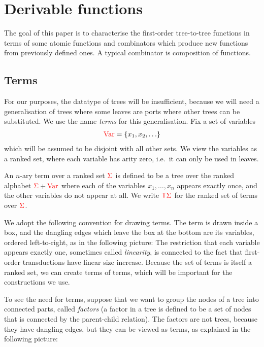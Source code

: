 \section{Derivable functions}
The goal of this paper is to characterise the first-order tree-to-tree functions in terms of some atomic functions and combinators which produce new functions from previously defined ones. A typical combinator is composition of functions.

\subsection{Terms}
For our purposes, the datatype of trees will be insufficient, because  we will need a generalisation of trees where some leaves  are ports   where other trees can be substituted. We use the name \emph{terms} for this generalisation. Fix a set of variables
\begin{align*}
    {{\color{red}{\mathrm{Var}}}} = \{x_1,x_2,\ldots\}
\end{align*}
which will be assumed to be disjoint with all other sets.  We view the variables as a ranked set, where each variable has arity zero, i.e.~it can only be used in leaves. 

\begin{definition}[Terms]\label{def:terms}
    An $n$-ary term over a ranked set ${\color{red}{\Sigma}}$ is defined to be a tree over the ranked alphabet ${\color{red}{\Sigma}} + {{\color{red}{\mathrm{Var}}}}$ where each of the  variables $x_1,\ldots,x_n$ appears exactly once,  and the other variables do not appear at all.    We write ${\color{red}{\mathsf T}} {\color{red}{\Sigma}}$ for the ranked set of terms over ${\color{red}{\Sigma}}$. 
\end{definition}
 
We adopt the following convention for drawing terms. The term is drawn inside a box, and the dangling edges which leave the box at the bottom are its variables, ordered left-to-right, as in the following picture: 
 The restriction that each variable appears exactly one, sometimes called \emph{linearity}, is connected to the fact that first-order transductions have linear size increase. Because the set of terms is itself a ranked set,  we can create terms of terms, which will be important for the constructions we use.  

To see the need for terms, suppose that we want to group the nodes of a tree into connected parts, called \emph{factors} (a factor in a tree is defined to be a set of nodes that is connected by the parent-child relation). The factors are not trees, because they have dangling edges, but they can be viewed as terms, as explained in the following picture:
        
